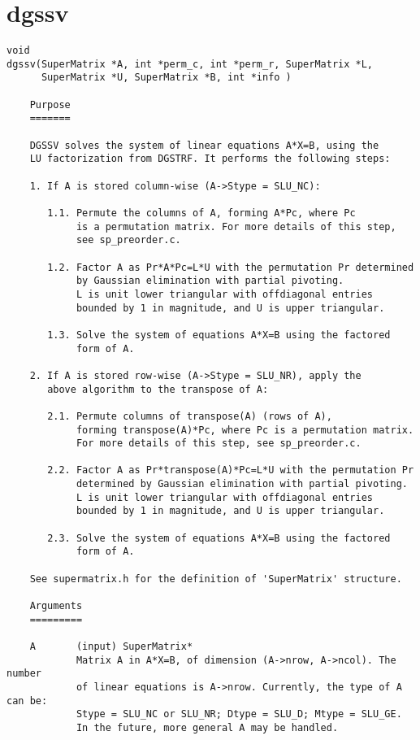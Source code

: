 \section{dgssv}
\begin{verbatim}
void
dgssv(SuperMatrix *A, int *perm_c, int *perm_r, SuperMatrix *L,
      SuperMatrix *U, SuperMatrix *B, int *info )

    Purpose
    =======
  
    DGSSV solves the system of linear equations A*X=B, using the
    LU factorization from DGSTRF. It performs the following steps:
 
    1. If A is stored column-wise (A->Stype = SLU_NC):
 
       1.1. Permute the columns of A, forming A*Pc, where Pc
            is a permutation matrix. For more details of this step, 
            see sp_preorder.c.
 
       1.2. Factor A as Pr*A*Pc=L*U with the permutation Pr determined
            by Gaussian elimination with partial pivoting.
            L is unit lower triangular with offdiagonal entries
            bounded by 1 in magnitude, and U is upper triangular.
 
       1.3. Solve the system of equations A*X=B using the factored
            form of A.
 
    2. If A is stored row-wise (A->Stype = SLU_NR), apply the
       above algorithm to the transpose of A:
 
       2.1. Permute columns of transpose(A) (rows of A),
            forming transpose(A)*Pc, where Pc is a permutation matrix. 
            For more details of this step, see sp_preorder.c.
 
       2.2. Factor A as Pr*transpose(A)*Pc=L*U with the permutation Pr
            determined by Gaussian elimination with partial pivoting.
            L is unit lower triangular with offdiagonal entries
            bounded by 1 in magnitude, and U is upper triangular.
 
       2.3. Solve the system of equations A*X=B using the factored
            form of A.
 
    See supermatrix.h for the definition of 'SuperMatrix' structure.
  
    Arguments
    =========
 
    A       (input) SuperMatrix*
            Matrix A in A*X=B, of dimension (A->nrow, A->ncol). The number
            of linear equations is A->nrow. Currently, the type of A can be:
            Stype = SLU_NC or SLU_NR; Dtype = SLU_D; Mtype = SLU_GE.
            In the future, more general A may be handled.
   

\end{verbatim}
